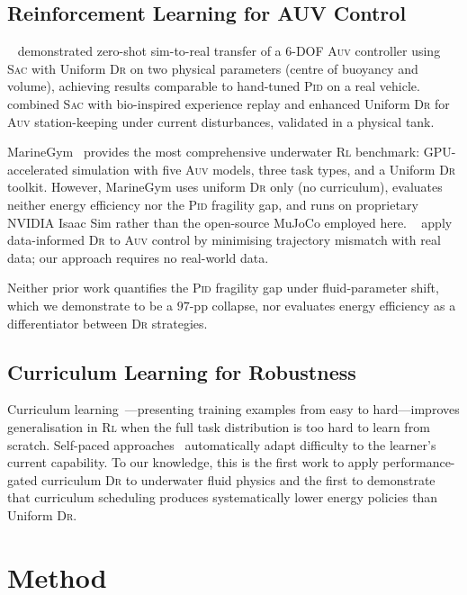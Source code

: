 \documentclass[letterpaper,10pt,journal]{IEEEtran}
\newcommand{\SAC}{\textsc{Sac}\xspace}
\newcommand{\PID}{\textsc{Pid}\xspace}
\newcommand{\AUV}{\textsc{Auv}\xspace}
\newcommand{\DR}{\textsc{Dr}\xspace}
\newcommand{\RL}{\textsc{Rl}\xspace}
\newcommand{\MuJoCo}{MuJoCo\xspace}
\begin{document}
\subsection{Reinforcement Learning for AUV Control}

\citeauthor{arndt2024}~\cite{arndt2024} demonstrated zero-shot
sim-to-real transfer of a $6$-DOF \AUV controller using \SAC with
Uniform \DR on two physical parameters (centre of buoyancy and volume),
achieving results comparable to hand-tuned \PID on a real vehicle.
\citeauthor{chaffre2025}~\cite{chaffre2025} combined \SAC with
bio-inspired experience replay and enhanced Uniform \DR for \AUV
station-keeping under current disturbances, validated in a physical tank.

MarineGym~\cite{chu2025} provides the most comprehensive underwater \RL
benchmark: GPU-accelerated simulation with five \AUV models, three
task types, and a Uniform \DR toolkit.
However, MarineGym uses uniform \DR only (no curriculum), evaluates
neither energy efficiency nor the \PID fragility gap, and runs on
proprietary NVIDIA Isaac Sim rather than the open-source \MuJoCo
employed here.
\citeauthor{wu2023}~\cite{wu2023} apply data-informed \DR to \AUV
control by minimising trajectory mismatch with real data; our approach
requires no real-world data.

Neither prior work quantifies the \PID fragility gap under
fluid-parameter shift, which we demonstrate to be a $97$-pp collapse,
nor evaluates energy efficiency as a differentiator between \DR strategies.

\subsection{Curriculum Learning for Robustness}

Curriculum learning~\cite{bengio2009}---presenting training examples from
easy to hard---improves generalisation in \RL when the full task
distribution is too hard to learn from scratch.
Self-paced approaches~\cite{klink2020} automatically adapt difficulty
to the learner's current capability.
To our knowledge, this is the first work to apply performance-gated
curriculum \DR to underwater fluid physics and the first to demonstrate
that curriculum scheduling produces systematically lower energy policies
than Uniform \DR.

\section{Method}
\label{sec:method}
\end{document}
